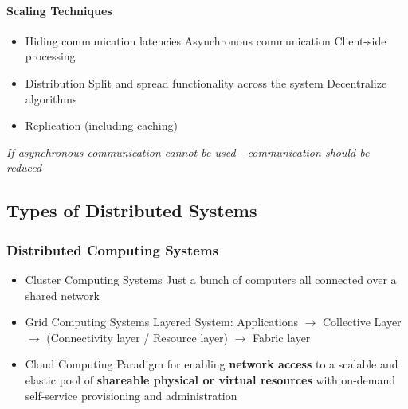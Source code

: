 \paragraph{Scaling Techniques}
\begin{itemize}
	\item Hiding communication latencies
	\subitem Asynchronous communication
	\subitem Client-side processing
	\item Distribution
	\subitem Split and spread functionality across the system
	\subitem Decentralize algorithms
	\item Replication (including caching)
\end{itemize}
\textit{If asynchronous communication cannot be used - communication should be reduced}

\subsection{Types of Distributed Systems}
\subsubsection{Distributed Computing Systems}
\begin{itemize}
	\item Cluster Computing Systems
	\subitem Just a bunch of computers all connected over a shared network
	\item Grid Computing Systems
	\subitem Layered System: Applications $\rightarrow$ Collective Layer $\rightarrow$ (Connectivity layer / Resource layer) $\rightarrow$ Fabric layer
	\item Cloud Computing
	\subitem Paradigm for enabling \textbf{network access} to a scalable and elastic pool of \textbf{shareable physical or virtual resources} with on-demand self-service provisioning and administration
\end{itemize}
